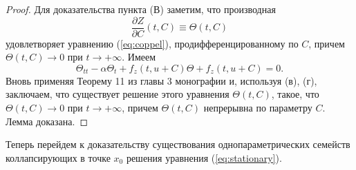 \begin{proof}
Для доказательства пункта (В) заметим, что производная
%
\begin{equation}
\frac{\partial Z}{\partial C}(t,C)\equiv\Theta(t,C)
\end{equation}
%
удовлетворяет уравнению (\ref{eq:coppel}), продифференцированному по $C$, причем \\ $\Theta(t, C)\to0$ при $t \to +\infty$.
Имеем
%
\begin{equation}
{\Theta}_{tt}-\alpha {\Theta}_t+f_z(t,u+C)\Theta+f_z(t,u+C) = 0.
\label{eq:coppel_diff}
\end{equation}
%
Вновь применяя Теорему 11 из главы 3 монографии \cite{Coppel} и, используя (в), (г), заключаем, что существует решение этого уравнения $\Theta(t,C)$, такое, что \\ $\Theta(t, C)\to0$ при $t \to +\infty$, причем $\Theta(t, C)$ непрерывна по параметру $C$.
Лемма доказана.
\end{proof}

Теперь перейдем к доказательству существования однопараметрических семейств коллапсирующих в точке $x_0$ решения уравнения (\ref{eq:stationary}).

